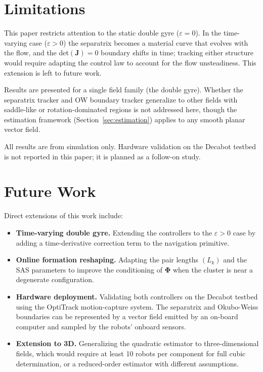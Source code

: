 \documentclass[lettersize,journal]{IEEEtran}
\begin{document}
\section{Limitations}
\label{sec:limitations}

This paper restricts attention to the static double gyre ($\varepsilon = 0$).
In the time-varying case ($\varepsilon > 0$) the separatrix becomes a
material curve that evolves with the flow, and the det$(\mathbf{J}) = 0$
boundary shifts in time; tracking either structure would require adapting
the control law to account for the flow unsteadiness. This extension is
left to future work.

Results are presented for a single field family (the double gyre). Whether
the separatrix tracker and OW boundary tracker generalize to other fields
with saddle-like or rotation-dominated regions is not addressed here,
though the estimation framework (Section~\ref{sec:estimation}) applies
to any smooth planar vector field.

All results are from simulation only. Hardware validation on the Decabot
testbed is not reported in this paper; it is planned as a follow-on study.


\section{Future Work}
\label{sec:future}

Direct extensions of this work include:
\begin{itemize}
    \item \textbf{Time-varying double gyre.} Extending the controllers to
          the $\varepsilon > 0$ case by adding a time-derivative correction
          term to the navigation primitive.
    \item \textbf{Online formation reshaping.} Adapting the pair lengths
          $(L_k)$ and the SAS parameters to improve the conditioning of
          $\boldsymbol{\Phi}$ when the cluster is near a degenerate
          configuration.
    \item \textbf{Hardware deployment.} Validating both controllers on the
          Decabot testbed using the OptiTrack motion-capture system. The
          separatrix and Okubo-Weiss boundaries can be represented by a
          vector field emitted by an on-board computer and sampled by
          the robots' onboard sensors.
    \item \textbf{Extension to 3D.} Generalizing the quadratic estimator
          to three-dimensional fields, which would require at least 10 robots
          per component for full cubic determination, or a reduced-order
          estimator with different assumptions.
\end{itemize}
\end{document}
